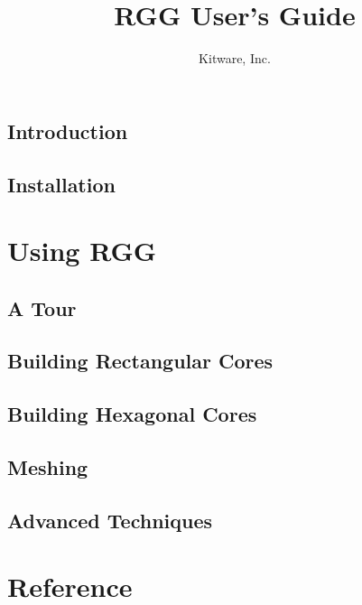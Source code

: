 \documentclass[letterpaper,10pt,draft]{book}
\title{RGG User's Guide}
\author{Kitware, Inc.}
\begin{document}
\maketitle
\tableofcontents

\chapter{Introduction}
\label{chapter:Introduction}


\chapter{Installation}
\label{Installation}


\part{Using RGG}

\chapter{A Tour}
\label{chapter:ATour}



\chapter{Building Rectangular Cores}
\label{chapter:ExampleBuildingARectangularCore}


\chapter{Building Hexagonal Cores}
\label{chapter:ExampleBuildingAHexagonalCore}


\chapter{Meshing}
\label{chapter:Meshing}




\chapter{Advanced Techniques}
\label{chapter:AdvancedTechniques}

\part{Reference}
\end{document}
